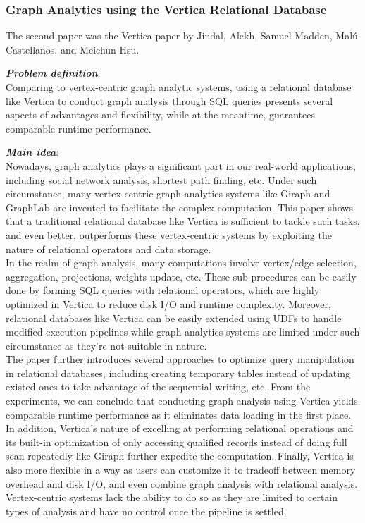 \subsubsection{Graph Analytics using the Vertica Relational Database} 
The second paper was the Vertica paper by Jindal, Alekh, Samuel Madden, Malú Castellanos, and Meichun Hsu.\cite{jindal2015graph}
\begin{itemize*}
\item {\em \textbf{Problem definition}}:  \\
Comparing to vertex-centric graph analytic systems, using a relational database like Vertica to conduct graph analysis through SQL queries presents several aspects of advantages and flexibility, while at the meantime, guarantees comparable runtime performance. \\ 

\item {\em \textbf{Main idea}}:\\
Nowadays, graph analytics plays a significant part in our real-world applications, including social network analysis, shortest path finding, etc. Under such circumstance, many vertex-centric graph analytics systems like Giraph and GraphLab are invented to facilitate the complex computation. This paper shows that a traditional relational database like Vertica is sufficient to tackle such tasks, and even better, outperforms these vertex-centric systems by exploiting the nature of relational operators and data storage. \\ 

In the realm of graph analysis, many computations involve vertex/edge selection, aggregation, projections, weights update, etc. These sub-procedures can be easily done by forming SQL queries with relational operators, which are highly optimized in Vertica to reduce disk I/O and runtime complexity. Moreover, relational databases like Vertica can be easily extended using UDFs to handle modified execution pipelines while graph analytics systems are limited under such circumstance as they’re not suitable in nature. \\

The paper further introduces several approaches to optimize query manipulation in relational databases, including creating temporary tables instead of updating existed ones to take advantage of the sequential writing, etc. From the experiments, we can conclude that conducting graph analysis using Vertica yields comparable runtime performance as it eliminates data loading in the first place. In addition, Vertica’s nature of excelling at performing relational operations and its built-in optimization of only accessing qualified records instead of doing full scan repeatedly like Giraph further expedite the computation. Finally, Vertica is also more flexible in a way as users can customize it to tradeoff between memory overhead and disk I/O, and even combine graph analysis with relational analysis. Vertex-centric systems lack the ability to do so as they are limited to certain types of analysis and have no control once the pipeline is settled.\\ 


\end{itemize*}
